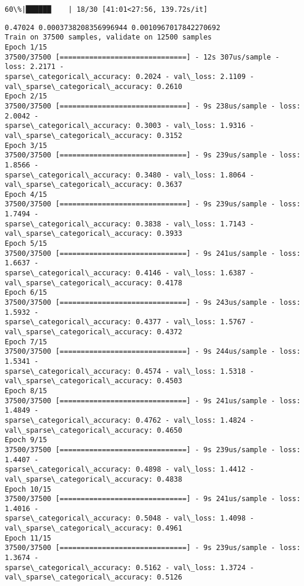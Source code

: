 \documentclass[11pt]{article}
\begin{document}
    \begin{Verbatim}[commandchars=\\\{\}]
 60\%|██████    | 18/30 [41:01<27:56, 139.72s/it]
    \end{Verbatim}

    \begin{Verbatim}[commandchars=\\\{\}]
0.47024 0.0003738208356996944 0.0010967017842270692
Train on 37500 samples, validate on 12500 samples
Epoch 1/15
37500/37500 [==============================] - 12s 307us/sample - loss: 2.2171 -
sparse\_categorical\_accuracy: 0.2024 - val\_loss: 2.1109 -
val\_sparse\_categorical\_accuracy: 0.2610
Epoch 2/15
37500/37500 [==============================] - 9s 238us/sample - loss: 2.0042 -
sparse\_categorical\_accuracy: 0.3003 - val\_loss: 1.9316 -
val\_sparse\_categorical\_accuracy: 0.3152
Epoch 3/15
37500/37500 [==============================] - 9s 239us/sample - loss: 1.8566 -
sparse\_categorical\_accuracy: 0.3480 - val\_loss: 1.8064 -
val\_sparse\_categorical\_accuracy: 0.3637
Epoch 4/15
37500/37500 [==============================] - 9s 239us/sample - loss: 1.7494 -
sparse\_categorical\_accuracy: 0.3838 - val\_loss: 1.7143 -
val\_sparse\_categorical\_accuracy: 0.3933
Epoch 5/15
37500/37500 [==============================] - 9s 241us/sample - loss: 1.6637 -
sparse\_categorical\_accuracy: 0.4146 - val\_loss: 1.6387 -
val\_sparse\_categorical\_accuracy: 0.4178
Epoch 6/15
37500/37500 [==============================] - 9s 243us/sample - loss: 1.5932 -
sparse\_categorical\_accuracy: 0.4377 - val\_loss: 1.5767 -
val\_sparse\_categorical\_accuracy: 0.4372
Epoch 7/15
37500/37500 [==============================] - 9s 244us/sample - loss: 1.5341 -
sparse\_categorical\_accuracy: 0.4574 - val\_loss: 1.5318 -
val\_sparse\_categorical\_accuracy: 0.4503
Epoch 8/15
37500/37500 [==============================] - 9s 241us/sample - loss: 1.4849 -
sparse\_categorical\_accuracy: 0.4762 - val\_loss: 1.4824 -
val\_sparse\_categorical\_accuracy: 0.4650
Epoch 9/15
37500/37500 [==============================] - 9s 239us/sample - loss: 1.4407 -
sparse\_categorical\_accuracy: 0.4898 - val\_loss: 1.4412 -
val\_sparse\_categorical\_accuracy: 0.4838
Epoch 10/15
37500/37500 [==============================] - 9s 241us/sample - loss: 1.4016 -
sparse\_categorical\_accuracy: 0.5048 - val\_loss: 1.4098 -
val\_sparse\_categorical\_accuracy: 0.4961
Epoch 11/15
37500/37500 [==============================] - 9s 239us/sample - loss: 1.3674 -
sparse\_categorical\_accuracy: 0.5162 - val\_loss: 1.3724 -
val\_sparse\_categorical\_accuracy: 0.5126

\end{Verbatim}
\end{document}
